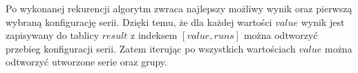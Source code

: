 Po wykonanej rekurencji algorytm zwraca najlepszy możliwy wynik oraz pierwszą wybraną konfigurację serii. Dzięki temu, że dla każdej wartości $value$ wynik jest zapisywany do tablicy $result$ z indeksem $[value, runs]$ można odtworzyć przebieg konfiguracji serii. Zatem iterując po wszystkich wartościach $value$ można odtworzyć utworzone serie oraz grupy.



